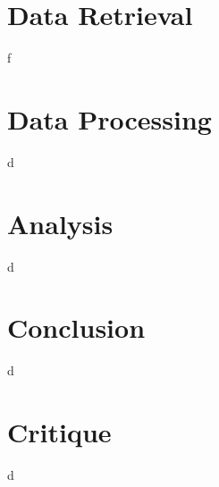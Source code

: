 \documentclass[fontsize=11pt, parskip=half]{scrartcl}
\begin{document}
\section{Data Retrieval}
\label{section:retrieval}

    f

\section{Data Processing}
\label{section:processing}

    d
    
\section{Analysis}
\label{section:analysis}

    d

\section{Conclusion}
\label{section:conclusion}

    d

\section{Critique}
\label{section:critique}

    d

\newpage

\onecolumn
\printbibliography[heading=bibintoc, title={References}]
\end{document}
